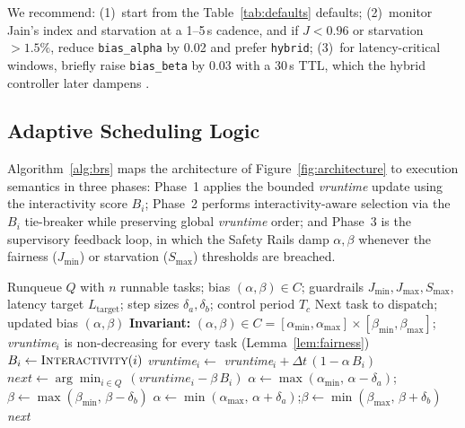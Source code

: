 We recommend: (1)~start from the Table~\ref{tab:defaults} defaults; (2)~monitor Jain's index and starvation at a 1--5\,s cadence, and if $J<0.96$ or starvation $>1.5\%$, reduce \texttt{bias\_alpha} by 0.02 and prefer \texttt{hybrid}; (3)~for latency-critical windows, briefly raise \texttt{bias\_beta} by 0.03 with a 30\,s TTL, which the hybrid controller later dampens \cite{10306992}.


\subsection{Adaptive Scheduling Logic}
\label{subsec:pseudocode}

Algorithm~\ref{alg:brs} maps the architecture of Figure~\ref{fig:architecture} to execution semantics in three phases: Phase~1 applies the bounded \textit{vruntime} update using the interactivity score $B_i$; Phase~2 performs interactivity-aware selection via the $B_i$ tie-breaker while preserving global \textit{vruntime} order; and Phase~3 is the supervisory feedback loop, in which the Safety Rails damp $\alpha,\beta$ whenever the fairness ($J_{\min}$) or starvation ($S_{\max}$) thresholds are breached.

\begin{algorithm}[t]
\caption{Kernel-Level BRS Scheduling Logic}
\label{alg:brs}
\small
\begin{algorithmic}[1]
\REQUIRE Runqueue $Q$ with $n$ runnable tasks; bias $(\alpha,\beta)\in C$; guardrails $J_{\min},J_{\max},S_{\max}$, latency target $L_{\text{target}}$; step sizes $\delta_a,\delta_b$; control period $T_c$
\ENSURE Next task to dispatch; updated bias $(\alpha,\beta)$
\STATE \textbf{Invariant:} $(\alpha,\beta)\in C=[\alpha_{\min},\alpha_{\max}]\times[\beta_{\min},\beta_{\max}]$; \textit{vruntime}$_i$ is non-decreasing for every task (Lemma~\ref{lem:fairness})
\STATE {}
    \STATE $B_i \leftarrow \textsc{Interactivity}(i)$ 
    \STATE \textit{vruntime}$_i \leftarrow$ \textit{vruntime}$_i + \Delta t\,(1-\alpha\, B_i)$
\ENDFOR
\STATE {}
\STATE $\textit{next} \leftarrow \arg\min_{i\in Q}\,(\textit{vruntime}_i - \beta\, B_i)$ 
\STATE {}
    \STATE $\alpha \leftarrow \max(\alpha_{\min},\, \alpha-\delta_a)$;\quad $\beta \leftarrow \max(\beta_{\min},\, \beta-\delta_b)$ 
    \STATE $\alpha \leftarrow \min(\alpha_{\max},\, \alpha+\delta_a)$;\quad $\beta \leftarrow \min(\beta_{\max},\, \beta+\delta_b)$ 
\ENDIF
\RETURN \textit{next}
\end{algorithmic}
\end{algorithm}

